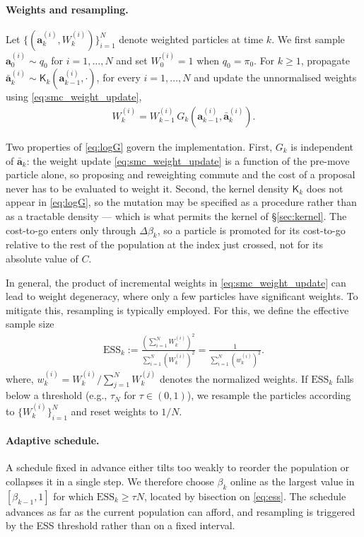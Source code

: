 \paragraph{Weights and resampling.}
Let $\{(\mathbf{a}_k^{(i)}, W_k^{(i)})\}_{i=1}^N$ denote weighted particles at time $k$. We first sample $\mathbf{a}_0^{(i)} \sim q_0$ for $i = 1, \ldots, N$ and set $W_0^{(i)} = 1$ when $q_0 = \pi_0$. For $k \geq 1$, propagate $\bar{\mathbf{a}}_k^{(i)} \sim \mathsf{K}_k (\mathbf{a}_{k-1}^{(i)}, \cdot )$,
for every $i = 1, \ldots, N$ and update the unnormalised weights using \eqref{eq:smc_weight_update},
\begin{align}\label{eq:smc_weight_update}
W_k^{(i)} = W_{k-1}^{(i)} \, G_k\!\left(\mathbf{a}_{k-1}^{(i)}, \bar{\mathbf{a}}_k^{(i)}\right).
\end{align}

Two properties of \eqref{eq:logG} govern the implementation. First, $G_k$ is independent of
$\bar{\mathbf{a}}_k$: the weight update \eqref{eq:smc_weight_update} is a function of the
pre-move particle alone, so proposing and reweighting commute and the cost of a proposal
never has to be evaluated to weight it. Second, the kernel density
$\mathsf{K}_k$ does not appear in \eqref{eq:logG}, so the mutation may be specified as a
procedure rather than as a tractable density --- which is what permits the kernel of
\S\ref{sec:kernel}. The cost-to-go enters only through $\Delta\beta_k$, so a particle is
promoted for its cost-to-go relative to the rest of the population at the index just
crossed, not for its absolute value of $C$.

In general, the product of incremental weights in \eqref{eq:smc_weight_update} can lead to weight degeneracy, where only a few particles have significant weights. To mitigate this, resampling is typically employed. For this, we define the effective sample size
\begin{align}\label{eq:ess}
\text{ESS}_k := \frac{\left(\sum_{i=1}^N W_k^{(i)}\right)^2}{\sum_{i=1}^N \left(W_k^{(i)}\right)^2}
= \frac{1}{\sum_{i=1}^N \left(w_k^{(i)}\right)^2}.    
\end{align}
where,  $w_k^{(i)} = W_k^{(i)} / \sum_{j=1}^N W_k^{(j)}$ denotes the normalized weights. 
If $\text{ESS}_k$ falls below a threshold (e.g., $\tau_N$ for $\tau \in (0,1)$), we resample the particles according to $\{W_k^{(i)}\}_{i=1}^N$ and reset weights to $1/N$.

\paragraph{Adaptive schedule.}
A schedule fixed in advance either tilts too weakly to reorder the population or collapses
it in a single step. We therefore choose $\beta_k$ online as the largest value in
$[\beta_{k-1},1]$ for which $\text{ESS}_k\geq\tau N$, located by bisection on
\eqref{eq:ess}. The schedule advances as far as the current population can afford, and
resampling is triggered by the ESS threshold rather than on a fixed interval.

